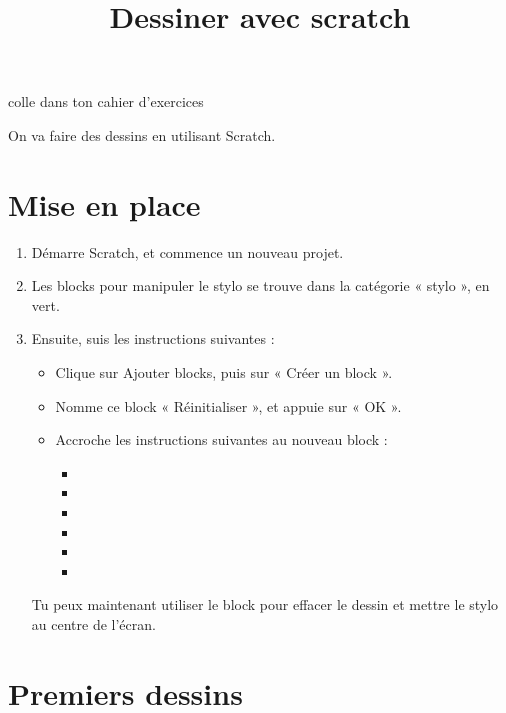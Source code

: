 \documentclass[a4paper,11pt]{article}
\title{Dessiner avec scratch}
\author{}
\date{}
\makeatletter
\renewcommand{\maketitle}{%
{\scriptsize colle dans ton cahier d'exercices}
	\begin{center}
		\LARGE
		\myuline{\@title}
		\vspace{1em}
	\end{center}
}
\makeatother
\begin{document}
\maketitle

On va faire des dessins en utilisant Scratch.

\section{Mise en place}

\begin{enumerate}[1)]
	\item Démarre Scratch, et commence un nouveau projet.
	\item Les blocks pour manipuler le stylo se trouve dans la catégorie « stylo », en {\color{Green}vert}.
	\item Ensuite, suis les instructions suivantes :
	      \begin{itemize}
		      \item Clique sur {\color{violet}Ajouter blocks}, puis sur « Créer un block ».
		      \item Nomme ce block « Réinitialiser », et appuie sur « OK ».
		      \item Accroche les instructions suivantes au nouveau block :
		            \begin{itemize}
			            \item[] 
			            \item[] 
			            \item[] 
			            \item[] 
			            \item[] 
			            \item[] 
		            \end{itemize}
	      \end{itemize}
	      Tu peux maintenant utiliser le block  pour effacer le dessin et mettre le stylo au centre de l'écran.
\end{enumerate}

\section{Premiers dessins}
\end{document}
